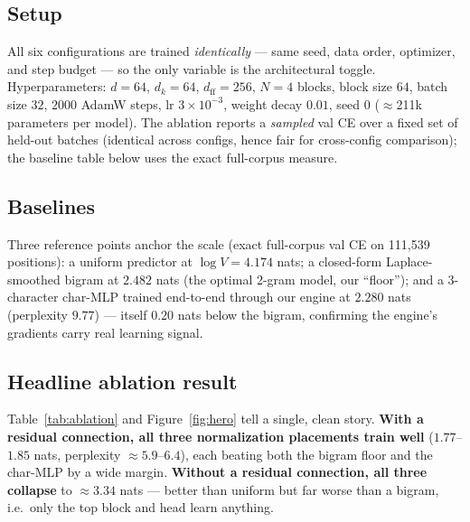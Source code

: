 \documentclass{article}
\begin{document}
\subsection{Setup} All six configurations are trained \emph{identically} — same seed, data order, optimizer, and step budget — so the only variable is the architectural toggle. Hyperparameters: $d=64$, $d_k=64$, $d_{\text{ff}}=256$, $N=4$ blocks, block size $64$, batch size $32$, $2000$ AdamW steps, lr $3\times10^{-3}$, weight decay $0.01$, seed $0$ ($\approx$211k parameters per model). The ablation reports a \emph{sampled} val CE over a fixed set of held-out batches (identical across configs, hence fair for cross-config comparison); the baseline table below uses the exact full-corpus measure.

\subsection{Baselines} Three reference points anchor the scale (exact full-corpus val CE on 111{,}539 positions): a uniform predictor at $\log V=4.174$ nats; a closed-form Laplace-smoothed bigram at $2.482$ nats (the optimal 2-gram model, our ``floor''); and a 3-character char-MLP trained end-to-end through our engine at $2.280$ nats (perplexity $9.77$) — itself $0.20$ nats below the bigram, confirming the engine's gradients carry real learning signal.

\subsection{Headline ablation result} Table~\ref{tab:ablation} and Figure~\ref{fig:hero} tell a single, clean story. \textbf{With a residual connection, all three normalization placements train well} ($1.77$--$1.85$ nats, perplexity $\approx 5.9$--$6.4$), each beating both the bigram floor and the char-MLP by a wide margin. \textbf{Without a residual connection, all three collapse} to $\approx 3.34$ nats — better than uniform but far worse than a bigram, i.e.\ only the top block and head learn anything.
\end{document}
